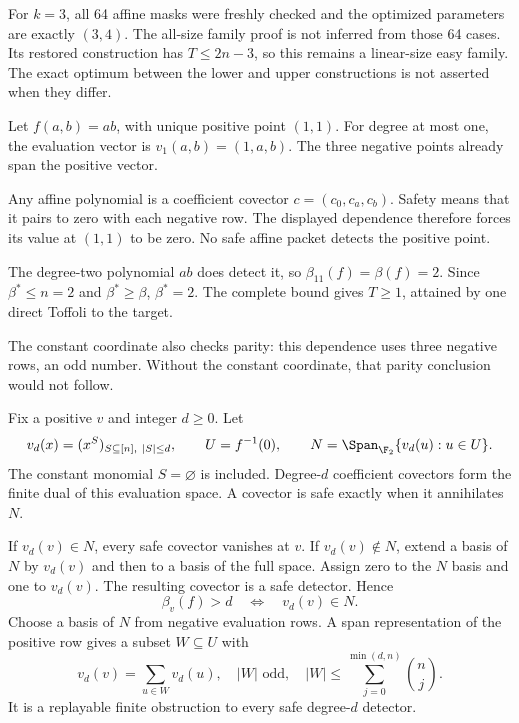 For $k=3$, all 64 affine masks were freshly checked and the optimized
parameters are exactly $(3,4)$. The all-size family proof is not inferred
from those 64 cases. Its restored construction has $T\le2n-3$, so this
remains a linear-size easy family. The exact optimum between the lower and
upper constructions is not asserted when they differ.


Let $f(a,b)=ab$, with unique positive point $(1,1)$. For degree at most one,
the evaluation vector is $v_1(a,b)=(1,a,b)$. The three negative points
already span the positive vector.


Any affine polynomial is a coefficient covector $c=(c_0,c_a,c_b)$.
Safety means that it pairs to zero with each negative row. The displayed
dependence therefore forces its value at $(1,1)$ to be zero. No safe affine
packet detects the positive point.

The degree-two polynomial $ab$ does detect it, so
$\beta_{11}(f)=\beta(f)=2$. Since $\beta^*\le n=2$ and $\beta^*\ge\beta$,
$\beta^*=2$. The complete bound gives $T\ge1$, attained by one direct
Toffoli to the target.

The constant coordinate also checks parity: this dependence uses three
negative rows, an odd number. Without the constant coordinate, that parity
conclusion would not follow.


Fix a positive $v$ and integer $d\ge0$. Let
\[
 v_d(x)=(x^S)_{S\subseteq[n],\ |S|\le d},\qquad
 U=f^{-1}(0),\qquad N=\Span_{\F_2}\{v_d(u):u\in U\}.
\]
The constant monomial $S=\varnothing$ is included. Degree-$d$ coefficient
covectors form the finite dual of this evaluation space. A covector is safe
exactly when it annihilates $N$.

If $v_d(v)\in N$, every safe covector vanishes at $v$. If $v_d(v)\notin N$,
extend a basis of $N$ by $v_d(v)$ and then to a basis of the full space.
Assign zero to the $N$ basis and one to $v_d(v)$. The resulting covector is
a safe detector. Hence
\[
 \boxed{\beta_v(f)>d\quad\Longleftrightarrow\quad v_d(v)\in N.}
\]
Choose a basis of $N$ from negative evaluation rows. A span representation
of the positive row gives a subset $W\subseteq U$ with
\[
 v_d(v)=\sum_{u\in W}v_d(u),\quad |W|\text{ odd},\quad
 |W|\le\sum_{j=0}^{\min(d,n)}\binom nj.
\]
It is a replayable finite obstruction to every safe degree-$d$ detector.

